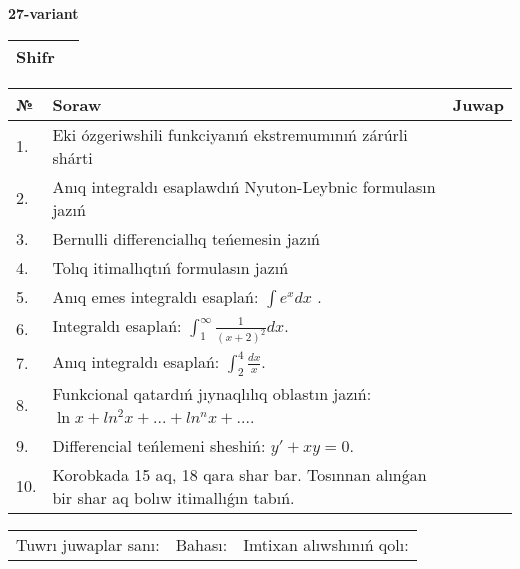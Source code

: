 \documentclass{article}
\begin{document}
  \egroup
  
  \newpage
  
  
  \textbf{27-variant}\\
  
  \bgroup
  \def\arraystretch{1.6} %
  
  \begin{tabular}{|m{5.7cm}|m{9.5cm}|}
  \hline
  Shifr & \\
  \hline
  \end{tabular}
  
  \vspace{1cm}
  
  \begin{tabular}{|m{0.7cm}|m{10cm}|m{4cm}|}
  \hline
  № & Soraw & Juwap \\
  \hline
  1. & Eki ózgeriwshili funkciyanıń ekstremumınıń zárúrli shárti &  \\
  \hline
  2. & Anıq integraldı esaplawdıń Nyuton-Leybnic formulasın jazıń &  \\
  \hline
  3. & Bernulli differenciallıq teńemesin jazıń &  \\
  \hline
  4. & Tolıq itimallıqtıń formulasın jazıń &  \\
  \hline
  5. & Anıq emes integraldı esaplań: \(\int{e^{x}dx}\) . &  \\
  \hline
  6. & Integraldı esaplań: \(\int_{1}^{\infty}{\frac{1}{(x + 2)^2 }dx}\). &  \\
  \hline
  7. & Anıq integraldı esaplań: \(\int_{2}^{4}\frac{dx}{x}\). &  \\
  \hline
  8. & Funkcional qatardıń jıynaqlılıq oblastın jazıń: \(\ln x + ln^2 x + ... + ln^{n}x + ...\). &  \\
  \hline
  9. & Differencial teńlemeni sheshiń: \(y' + xy = 0\). &  \\
  \hline
  10. & Korobkada 15 aq, 18 qara shar bar. Tosınnan alınǵan bir shar aq bolıw itimallıǵın tabıń. &  \\
  \hline
  \end{tabular}
  
  \vspace{1cm}
  
  \begin{tabular}{lll}
  Tuwrı juwaplar sanı: \underline{\hspace{1.5cm}} & 
  Bahası: \underline{\hspace{1.5cm}} & 
  Imtixan alıwshınıń qolı: \underline{\hspace{2cm}} \\
  \end{tabular}
  
\end{document}
